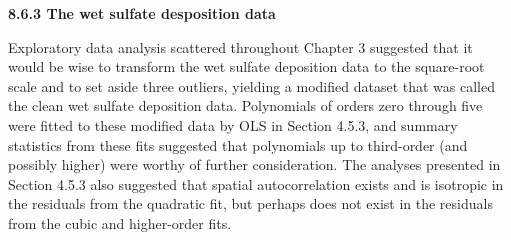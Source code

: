 \documentclass[12pt, titlepage]{article}
\begin{document}
\setcounter{equation}{0}
\renewcommand{\theequation}{R.\arabic{equation}}


%
%

{\large \textbf{8.6.3 The wet sulfate desposition data}}

\vspace{.3cm}

Exploratory data analysis scattered throughout Chapter 3 suggested that it would be wise to transform the wet sulfate deposition data to the square-root scale and to set aside three outliers, yielding a modified dataset that was called the clean wet sulfate deposition data.  Polynomials of orders zero through five were fitted to these modified data by OLS in Section 4.5.3, and summary statistics from these fits suggested that polynomials up to third-order (and possibly higher) were worthy of further consideration.  The analyses presented in Section 4.5.3 also suggested that spatial autocorrelation exists and is isotropic in the residuals from the quadratic fit, but perhaps does not exist in the residuals from the cubic and higher-order fits.
\end{document}
